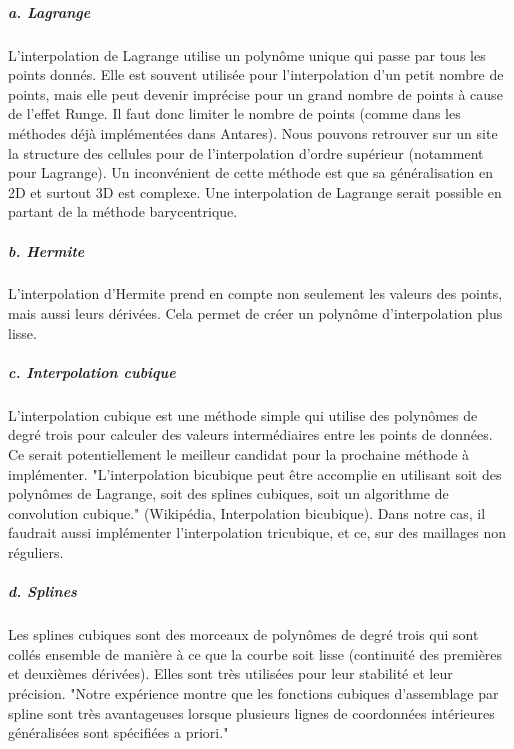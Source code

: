 \subparagraph{a. Lagrange}

L'interpolation de Lagrange utilise un polynôme unique qui passe par tous les points donnés. Elle est souvent utilisée pour l'interpolation d'un petit nombre de points, mais elle peut devenir imprécise pour un grand nombre de points à cause de l'effet Runge. Il faut donc limiter le nombre de points (comme dans les méthodes déjà implémentées dans Antares).
Nous pouvons retrouver sur un site \cite{structure} la structure des cellules pour de l'interpolation d'ordre supérieur (notamment pour Lagrange). Un inconvénient de cette méthode est que sa généralisation en 2D et surtout 3D est complexe.
Une interpolation de Lagrange serait possible en partant de la méthode barycentrique. \cite{Barycentric_Lagrange1} \cite{Barycentric_Lagrange2}


\subparagraph{b. Hermite \cite{bajaj}}

L'interpolation d'Hermite prend en compte non seulement les valeurs des points, mais aussi leurs dérivées. Cela permet de créer un polynôme d'interpolation plus lisse.

\subparagraph{c. Interpolation cubique}
L'interpolation cubique est une méthode simple qui utilise des polynômes de degré trois pour calculer des valeurs intermédiaires entre les points de données. \cite{tanaka} Ce serait potentiellement le meilleur candidat pour la prochaine méthode à implémenter. %
"L'interpolation bicubique peut être accomplie en utilisant soit des polynômes de Lagrange, soit des splines cubiques, soit un algorithme de convolution cubique." (Wikipédia, Interpolation bicubique). Dans notre cas, il faudrait aussi implémenter l'interpolation tricubique, et ce, sur des maillages non réguliers.

\subparagraph{d. Splines}

Les splines cubiques sont des morceaux de polynômes de degré trois qui sont collés ensemble de manière à ce que la courbe soit lisse (continuité des premières et deuxièmes dérivées). Elles sont très utilisées pour leur stabilité et leur précision.
"Notre expérience montre que les fonctions cubiques d'assemblage par spline sont très avantageuses lorsque plusieurs lignes de coordonnées intérieures généralisées sont spécifiées a priori." \cite{gordont1971}


